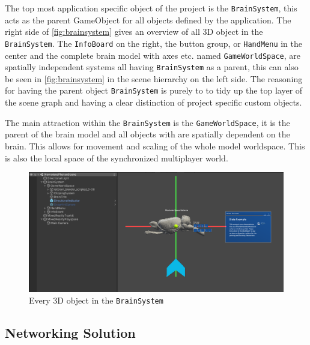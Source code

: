 The top most application specific object of the project is the \texttt{BrainSystem}, this acts as the parent GameObject for all objects defined by the application. The right side of \autoref{fig:brainsystem} gives an overview of all 3D object in the \texttt{BrainSystem}. The \texttt{InfoBoard} on the right, the button group, or \texttt{HandMenu} in the center and the complete brain model with axes etc. named \texttt{GameWorldSpace}, are spatially independent systems all having \texttt{BrainSystem} as a parent, this can also be seen in \autoref{fig:brainsystem} in the scene hierarchy on the left side. The reasoning for having the parent object \texttt{BrainSystem} is purely to to tidy up the top layer of the scene graph and having a clear distinction of project specific custom objects. 

The main attraction within the \texttt{BrainSystem} is the \texttt{GameWorldSpace}, it is the parent of the brain model and all objects with are spatially dependent on the brain. This allows for movement and scaling of the whole model worldspace. This is also the local space of the synchronized multiplayer world. 


\begin{figure}[ht]
    \centering
    \includegraphics[width=\textwidth]{fig/brainsystemoverview5.png}
    \caption{Every 3D object in the \texttt{BrainSystem}}
    \label{fig:brainsystem}
\end{figure}
\subsection*{Networking Solution}

